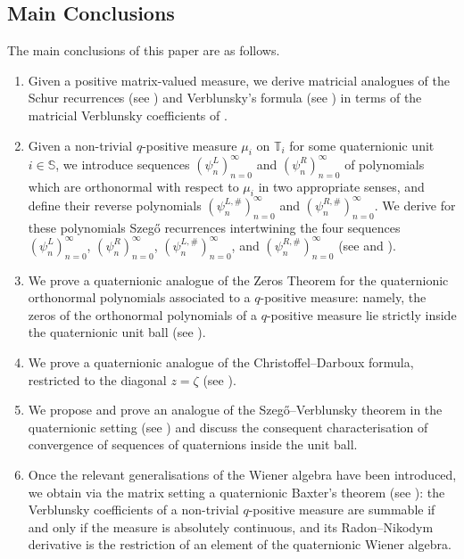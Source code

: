 \documentclass[11pt,reqno]{amsart}
\def\q{\psi}
\def\z{\zeta}
\def\SS{\mathbb{S}}
\def\TT{\mathbb{T}}
\theoremstyle{definition}
\numberwithin{equation}{section}
\begin{document}
\subsection{Main Conclusions}

The main conclusions of this paper are as follows.

\begin{enumerate}[label={(C\arabic*)}]
    \item Given a positive matrix-valued measure, we derive matricial analogues of the Schur recurrences (see ) and Verblunsky's formula (see ) in terms of the matricial Verblunsky coefficients of \cite{DPS08}.

    \item Given a non-trivial \(q\)-positive measure \(\mu_i\) on \(\TT_i\) for some quaternionic unit \(i \in \SS\), we introduce sequences \((\q_n^L)_{n=0}^{\infty}\) and \((\q_n^R)_{n=0}^{\infty}\) of polynomials which are orthonormal with respect to \(\mu_i\) in two appropriate senses, and define their reverse polynomials \((\q_n^{L,\#})_{n=0}^{\infty}\) and \((\q_n^{R,\#})_{n=0}^{\infty}\). We derive for these polynomials Szeg\H{o} recurrences intertwining the four sequences \((\q_n^L)_{n=0}^{\infty}\), \((\q_n^R)_{n=0}^{\infty}\), \((\q_n^{L,\#})_{n=0}^{\infty}\), and \((\q_n^{R,\#})_{n=0}^{\infty}\) (see  and ).

    \item We prove a quaternionic analogue of the Zeros Theorem for the quaternionic orthonormal polynomials associated to a \(q\)-positive measure: namely, the zeros of the orthonormal polynomials of a \(q\)-positive measure lie strictly inside the quaternionic unit ball (see ).

    \item We prove a quaternionic analogue of the Christoffel--Darboux formula, restricted to the diagonal \(z = \z\) (see ).

    \item We propose and prove an analogue of the Szeg\H{o}--Verblunsky theorem in the quaternionic setting (see ) and discuss the consequent characterisation of convergence of sequences of quaternions inside the unit ball.

    \item Once the relevant generalisations of the Wiener algebra have been introduced, we obtain via the matrix setting a quaternionic Baxter's theorem (see ): the Verblunsky coefficients of a non-trivial \(q\)-positive measure are summable if and only if the measure is absolutely continuous, and its Radon--Nikodym derivative is the restriction of an element of the quaternionic Wiener algebra.
\end{enumerate}
\end{document}
